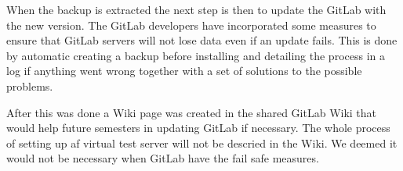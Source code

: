When the backup is extracted the next step is then to update the GitLab with the new version. The GitLab developers have incorporated some measures to ensure that GitLab servers will not lose data even if an update fails. This is done by automatic creating a backup before installing and detailing the process in a log if anything went wrong together with a set of solutions to the possible problems.

After this was done a Wiki page was created in the shared GitLab Wiki that would help future semesters in updating GitLab if necessary. The whole process of setting up af virtual test server will not be descried in the Wiki. We deemed it would not be necessary when GitLab have the fail safe measures.